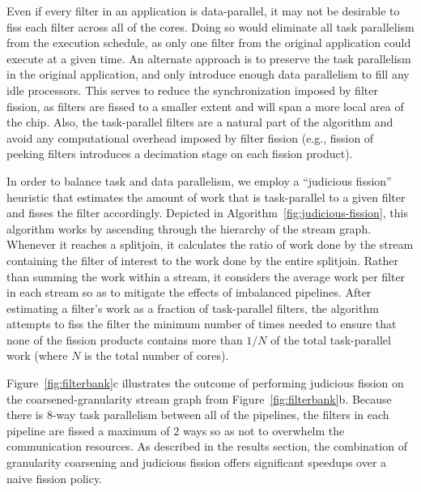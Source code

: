 Even if every filter in an application is data-parallel, it may not be
desirable to fiss each filter across all of the cores.  Doing so would
eliminate all task parallelism from the execution schedule, as only
one filter from the original application could execute at a given
time.  An alternate approach is to preserve the task parallelism in
the original application, and only introduce enough data parallelism
to fill any idle processors.  This serves to reduce the
synchronization imposed by filter fission, as filters are fissed to a
smaller extent and will span a more local area of the chip.  Also, the
task-parallel filters are a natural part of the algorithm and avoid
any computational overhead imposed by filter fission (e.g., fission of
peeking filters introduces a decimation stage on each fission
product).

In order to balance task and data parallelism, we employ a ``judicious
fission'' heuristic that estimates the amount of work that is
task-parallel to a given filter and fisses the filter accordingly.
Depicted in Algorithm~\ref{fig:judicious-fission}, this algorithm works
by ascending through the hierarchy of the stream graph.  Whenever it
reaches a splitjoin, it calculates the ratio of work done by the
stream containing the filter of interest to the work done by the
entire splitjoin.  Rather than summing the work within a stream, it
considers the average work per filter in each stream so as to mitigate
the effects of imbalanced pipelines.  After estimating a filter's work as a fraction of
task-parallel filters, the algorithm attempts to fiss the filter the
minimum number of times needed to ensure that none of the fission
products contains more than $1/N$ of the total task-parallel work
(where $N$ is the total number of cores).

Figure~\ref{fig:filterbank}c illustrates the outcome of performing
judicious fission on the coarsened-granularity stream graph from
Figure~\ref{fig:filterbank}b.  Because there is 8-way task
parallelism between all of the pipelines, the filters in each pipeline
are fissed a maximum of 2 ways so as not to overwhelm the
communication resources.  As described in the results section, the
combination of granularity coarsening and judicious fission offers
significant speedups over a naive fission policy.
